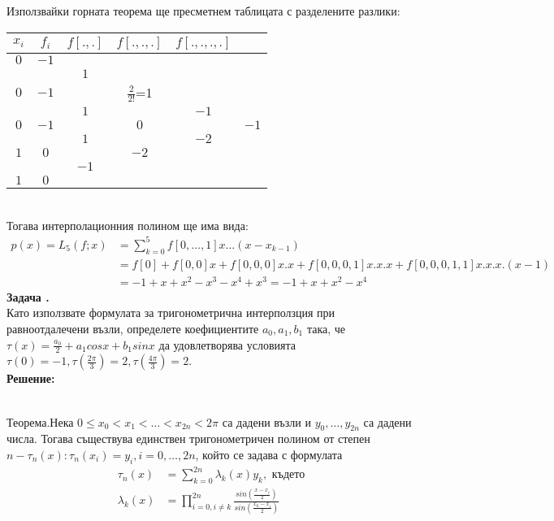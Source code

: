 \documentclass[12pt]{article}
\newcounter{problem}
\newcounter{solution}
\newcommand\problem{%
  \stepcounter{problem}%
  \textbf{Задача \theproblem.}~%
  \\
}
\newcommand\solution{%
  \textbf{Решение:}\\~%
}
\begin{document}
        Използвайки горната теорема ще пресметнем таблицата с разделените разлики:
        \begin{tabular}{|c c c c c c|}
        \hline
        $x_i$&$f_i$&$f[.,.]$&$f[.,.,.]$&$f[.,.,.,.]$\\
        \hline
        $0$ & $-1$ &      &                  &      &\\
            &      & $1$  &                  &      &\\
        $0$ & $-1$ &      & $\frac{2}{2!}$=1 &      &\\
            &      & $1$  &                  & $-1$ &\\
        $0$ & $-1$ &      & $0$              &      & $-1$\\
            &      & $1$  &                  & $-2$ &\\
        $1$ & $0$  &      & $-2$             &      &\\
            &      & $-1$ &                  &      &\\
        $1$ & $0$  &      &                  &      &\\
        \hline
        \end{tabular}\\
        Тогава интерполационния полином ще има вида:
        \begin{align*}
        p(x)=L_5(f;x) &= \sum_{k=0}^5f[0,\dotso,1]x\dotso(x-x_{k-1})\\
        &= f[0] + f[0,0]x+f[0,0,0]x.x+f[0,0,0,1]x.x.x+f[0,0,0,1,1]x.x.x.(x-1)\\
        &= -1 + x+ x^2 -x^3 -x^4 +x^3 = \boxed{-1 +x +x^2 -x^4}
        \end{align*}
    \problem
        Като използвате формулата за тригонометрична интерползция при равноотдалечени възли, определете коефициентите $a_0, a_1, b_1$ така, че $\tau(x)= \frac{a_0}{2}+a_1cosx+b_1sinx$ да удовлетворява условията $\tau(0)=-1, \tau(\frac{2\pi}{3})=2,\tau(\frac{4\pi}{3})=2$.\\
    \solution
        \begin{tcolorbox}[colback=red!5!white,colframe=red!75!black]
        Теорема.Нека $0\leq x_0<x_1<\ldots<x_{2n}<2\pi$ са дадени възли и $y_0,\ldots,y_{2n}$ са дадени числа. Тогава съществува единствен тригонометричен полином от степен $n - \tau_n(x):\tau_n(x_i)=y_i,i=0,\ldots,2n$, който се задава с формулата
        \begin{align*}
        \tau_n(x)&=\sum_{k=0}^{2n}\lambda_k(x)y_k,\text{ където}\\
        \lambda_k(x)&=\prod_{i=0,i\neq k}^{2n}\frac{sin\left(\frac{x-x_i}{2}\right)}{sin\left(\frac{x_k-x_i}{2}\right)}
        \end{align*}
        \end{tcolorbox}
\end{document}
